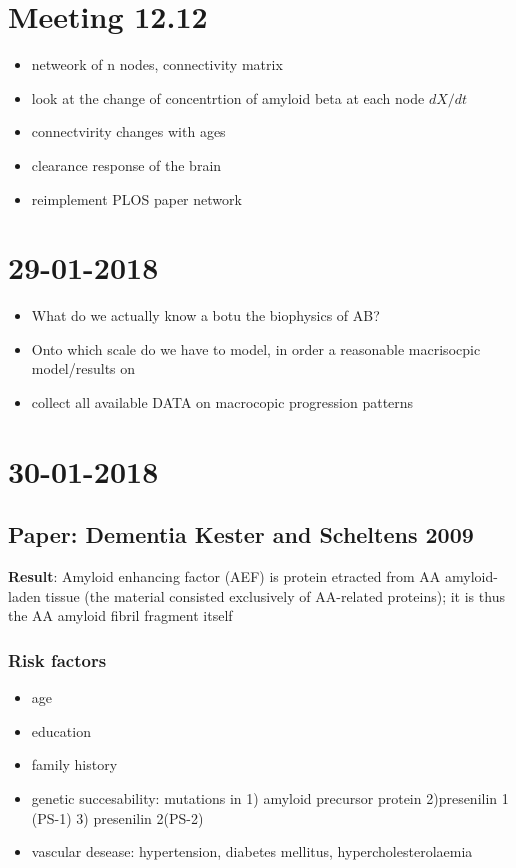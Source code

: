 \documentclass[fleqn]{article}\usepackage{caption}
\author{Anne-Lene Sax}
\date{\today}
\begin{document}
\section{Meeting 12.12}
\begin{itemize}
\item netweork of n nodes, connectivity matrix
\item look at the change of concentrtion of amyloid beta at each node $dX/dt$
\item connectvirity changes with ages
\item clearance response of the brain
\item reimplement PLOS paper network
\end{itemize}


\section{29-01-2018}
\begin{itemize}
\item What do we actually know a botu the biophysics of AB?
\item Onto which scale do we have to model, in order a reasonable macrisocpic model/results on 
\item collect all available DATA on macrocopic progression patterns
\end{itemize}

\section{30-01-2018}
\subsection{Paper: Dementia Kester and Scheltens 2009}
\textbf{Result}: Amyloid enhancing factor (AEF) is protein etracted from AA amyloid-laden tissue (the material consisted exclusively of AA-related proteins); it is thus the AA amyloid fibril fragment itself 

\subsubsection{Risk factors}
\begin{itemize}
\item age
\item education
\item family history
\item genetic succesability: mutations in 1) amyloid precursor protein 2)presenilin 1 (PS-1) 3) presenilin 2(PS-2)
\item vascular desease: hypertension, diabetes mellitus, hypercholesterolaemia
\end{itemize}
\end{document}

